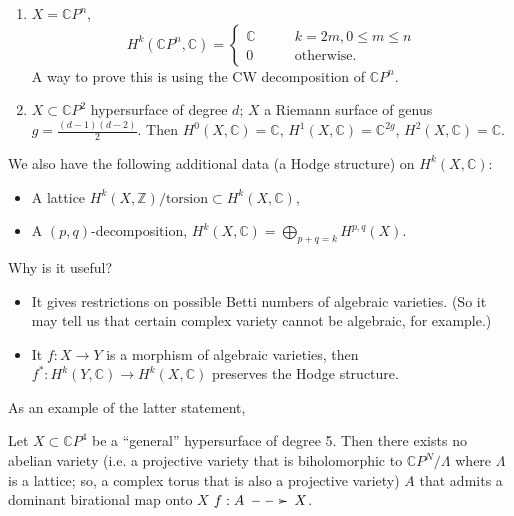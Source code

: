 \begin{example}
\label{example-singular-cohomology}
\begin{enumerate}
\item
$X=\mathbb{C}P^n$,
$$
H^k(\mathbb{C}P^n,\mathbb{C})=
\begin{cases}
  \mathbb{C}\qquad &k=2m, 0 \leq  m \leq  n
  \\
  0\qquad &\text{otherwise.}
\end{cases}
$$
A way to prove this is using the CW
decomposition of $\mathbb{C}P^n$.

\item $X \subset \mathbb{C}P^2$ hypersurface
of degree $d$;
$X$ a Riemann surface of genus
$g=\frac{(d-1)(d-2)}{2}$.
Then
$H^0(X,\mathbb{C})=\mathbb{C}$,
$H^1(X,\mathbb{C})=\mathbb{C}^{2g}$,
$H^2(X,\mathbb{C})=\mathbb{C}$.
\end{enumerate}
\end{example}

\noindent
We also have the following additional data
(a Hodge structure) on $H^k(X,\mathbb{C})$:
\begin{itemize}
\item A lattice
$H^k(X,\mathbb{Z})/\text{torsion}\subset
H^k(X,\mathbb{C})$,
\item A $(p,q)$-decomposition,
$H^k(X,\mathbb{C})=\bigoplus_{p+q=k}H^{p,q}
(X)$.
\end{itemize}

Why is it useful?
\begin{itemize}
\item It gives restrictions on possible Betti
numbers of algebraic varieties.
(So it may tell us that certain complex
variety cannot be algebraic,
for example.)

\item It $f:X \to Y$ is a morphism of
algebraic varieties,
then $f^*:H^k(Y,\mathbb{C}) \to
H^k(X,\mathbb{C})$
preserves the Hodge structure.
\end{itemize}

\noindent
As an example of the latter statement,

\begin{example}
\label{example-preserving-hodge-structure}
Let $X \subset \mathbb{C}P^4$ be a
``general'' hypersurface
of degree 5. Then there exists no abelian
variety
(i.e. a projective variety that is
biholomorphic
to $\mathbb{C}P^N/\Lambda$ where $\Lambda$ is
a lattice;
so, a complex torus that is also a projective
variety)
$A$ that admits a dominant birational map
onto $X$
$f:A\xymatrix{\ar@{-->}[r]&}X$.
\end{example}

